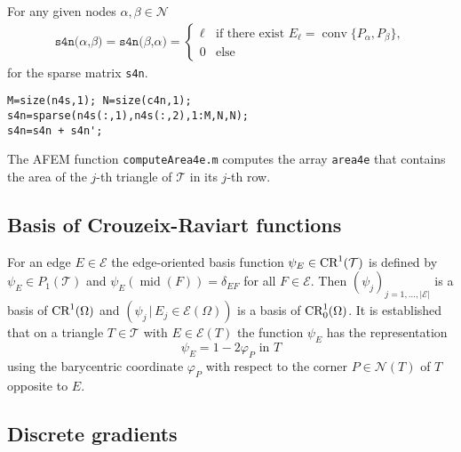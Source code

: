 %
For any given nodes $\alpha,\beta\in\mathcal{N}$
\begin{align*}
\texttt{s4n($\alpha$,$\beta$)} =
\texttt{s4n($\beta$,$\alpha$)} =
\begin{cases}
 \ell & \text{if there exist } E_\ell = \operatorname*{conv} \{ P_\alpha, P_\beta \},\\
    0 & \text{else}
\end{cases}
\end{align*}
for the sparse matrix \texttt{s4n}.
\begin{lstlisting}[frame=single,numbers=none]
M=size(n4s,1); N=size(c4n,1);
s4n=sparse(n4s(:,1),n4s(:,2),1:M,N,N);
s4n=s4n + s4n';
\end{lstlisting}
The AFEM function \texttt{computeArea4e.m} computes the 
array \texttt{area4e} that contains the area of the $j$-th 
triangle of $\mathcal T$ 
in its $j$-th row.


\subsection{Basis of Crouzeix-Raviart functions \cite{Carstensen2017script}}
For an edge $E\in\mathcal E$ the edge-oriented basis function
$\psi_E\in\textup{CR}^1(\mathcal T)$ is defined by
$\psi_E\in P_1(\mathcal T)$ and
$
\psi_E(\operatorname{mid}(F))=\delta_{EF} 
$ for all $F\in\mathcal E$.
Then $(\psi_j)_{j=1,\dots,|\mathcal{E}|}$ is a basis of $\textup{CR}^1(\Omega)$
and $(\psi_j \, | \, E_j\in\mathcal{E}(\Omega))$ is a basis of $\textup{CR}^1_0(\Omega)$.
It is established that on a triangle $T\in\mathcal T$ with $E\in\mathcal E (T)$ the
function
$\psi_E$ has the representation
\[
\psi_E = 1-2\varphi_P \text{ in } T
\] using the barycentric coordinate $\varphi_P$ with respect to 
the corner $P\in\mathcal N (T)$ of $T$ opposite to $E$.

\subsection{Discrete gradients }\label{sec:DiscreteGradients}

